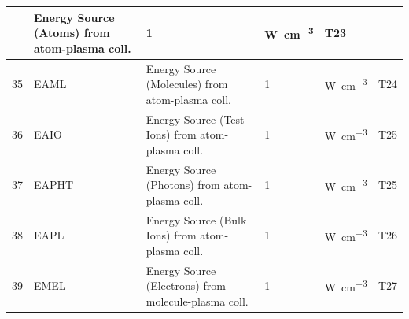 \begin{landscape}
\begin{longtable}{|r|l|l|l|l|c|}
                                                                   & Energy Source (Atoms)
    from atom-plasma coll.
                                                                   & 1
                                                                   &
    \si{\watt\per\cubic\centi\metre}                               & T23
    \\	\hline
    35                                                             & EAML
                                                                   & Energy Source (Molecules)
    from atom-plasma coll.
                                                                   & 1
                                                                   &
    \si{\watt\per\cubic\centi\metre}                               & T24
    \\	 \hline
    36                                                             & EAIO
                                                                   & Energy Source (Test Ions)
    from atom-plasma coll.
                                                                   & 1
                                                                   &
    \si{\watt\per\cubic\centi\metre}                               & T25
    \\ \hline
    37                                                             & EAPHT
                                                                   & Energy Source (Photons)
    from atom-plasma coll.
                                                                   & 1
                                                                   &
    \si{\watt\per\cubic\centi\metre}                               & T25
    \\ \hline
    38                                                             & EAPL
                                                                   & Energy Source (Bulk Ions)
    from atom-plasma coll.
                                                                   & 1
                                                                   &
    \si{\watt\per\cubic\centi\metre}                               & T26
    \\  \hline
    39                                                             & EMEL
                                                                   & Energy Source (Electrons)
    from molecule-plasma coll.
                                                                   & 1
                                                                   &
    \si{\watt\per\cubic\centi\metre}                               & T27

\end{longtable}
\end{landscape}
